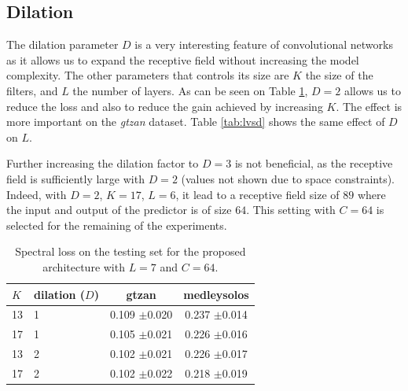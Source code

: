 \documentclass{article}
\newcommand{\fg}[1]{\textcolor{red}{FG : #1}}
\begin{document}
\subsection*{Dilation}

The dilation parameter $D$ is a very interesting feature of convolutional networks as it allows us to expand the receptive field without increasing the model complexity. The other parameters that controls its size are $K$ the size of the filters, and $L$ the number of layers. As can be seen on Table \ref{tab:kvsd}, $D=2$ allows us to reduce the loss and also to reduce the gain achieved by increasing $K$. The effect is more important on the \textit{gtzan} dataset. Table \ref{tab:lvsd} shows the same effect of $D$ on $L$. %

Further increasing the dilation factor to $D=3$ is not beneficial, as the receptive field is sufficiently large with $D=2$ (values not shown due to space constraints). Indeed, with $D=2$, $K=17$, $L=6$, it lead to a receptive field size of $89$ where the input and output of the predictor is of size $64$. This setting with $C=64$ is selected for the remaining of the experiments.

%


\begin{table}[t]
  \begin{center}
\begin{tabular}{llcc}
$K$ & dilation ($D$) & gtzan & medleysolos \\
\hline
13 & 1 & 0.109 $\pm$0.020 & 0.237 $\pm$0.014 \\
17 & 1 & 0.105 $\pm$0.021 & 0.226 $\pm$0.016 \\
13 & 2 & 0.102 $\pm$0.021 & 0.226 $\pm$0.017 \\
17 & 2 & 0.102 $\pm$0.022 & 0.218 $\pm$0.019 \\
\end{tabular}
\caption{Spectral loss on the testing set for the proposed architecture with $L=7$ and $C=64$.}
\label{tab:kvsd}
  \end{center}
  \vspace{-4mm}
\end{table}
\end{document}
